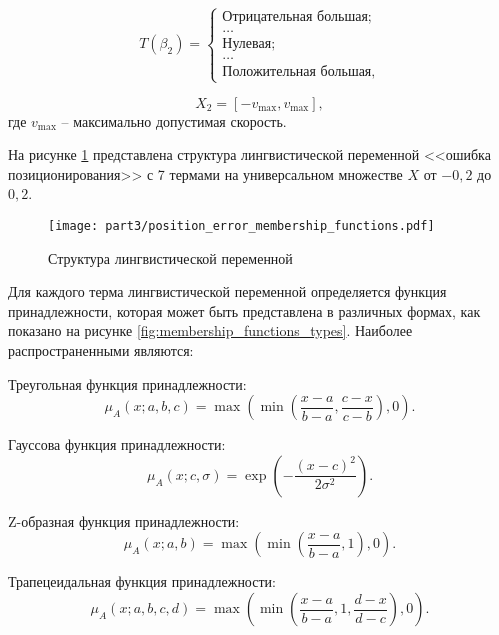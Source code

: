 \begin{equation}
	T(\beta_2) =\begin{cases}
		\text{Отрицательная большая}; \\
		\ldots                        \\
		\text{Нулевая} ;              \\
		\ldots                        \\
		\text{Положительная большая},
	\end{cases}
\end{equation}

\begin{equation}
	X_2 = [-v_{\text{max}}, v_{\text{max}}],
\end{equation}
где $v_{\text{max}}$ -- максимально допустимая скорость.

На рисунке \ref{fig:linguistic_variable_structure} представлена структура лингвистической переменной
<<ошибка позиционирования>> с
7 термами на универсальном множестве $X$ от $-0,2$ до $0,2$.

\begin{figure}[ht]
	\centering
	\texttt{[image: part3/position\_error\_membership\_functions.pdf]}
	\caption{Структура лингвистической переменной}
	\label{fig:linguistic_variable_structure}
\end{figure}

Для каждого терма лингвистической переменной определяется функция принадлежности,
которая может быть представлена в различных формах,
как показано на рисунке \ref{fig:membership_functions_types}.
Наиболее распространенными являются:

Треугольная функция принадлежности:
\begin{equation}
	\mu_A(x; a, b, c) = \max\left(\min\left(\frac{x-a}{b-a}, \frac{c-x}{c-b}\right), 0\right).
\end{equation}

Гауссова функция принадлежности:
\begin{equation}\label{eq:gaussian_membership}
	\mu_A(x; c, \sigma) = \exp\left(-\frac{(x-c)^2}{2\sigma^2}\right).
\end{equation}

Z-образная функция принадлежности:
\begin{equation}\label{eq:z_membership}
	\mu_A(x; a, b) = \max\left(\min\left(\frac{x-a}{b-a}, 1\right), 0\right).
\end{equation}

Трапецеидальная функция принадлежности:
\begin{equation}
	\mu_A(x; a, b, c, d) = \max\left(\min\left(\frac{x-a}{b-a}, 1, \frac{d-x}{d-c}\right), 0\right).
\end{equation}

